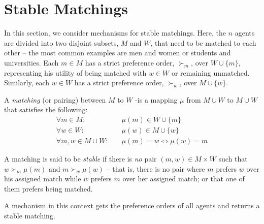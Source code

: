 \newpage

\newcommand{\men}{M}
\newcommand{\women}{W}
\newcommand{\man}{m}
\newcommand{\woman}{w}

\section{Stable Matchings}
In this section, we consider mechanisms for stable matchings. 
Here, the $n$ agents are divided into two disjoint subsets, $\men$ and $\women$, that need to be matched to each other -- the most common examples are men and women or students and universities. 
Each $\man \in \men$ has a strict preference order, $\succ_{\man}$, over $\women \cup \{\man\}$, representing his utility of being matched with $\woman \in \women$ or remaining unmatched.
Similarly, each $\woman \in \women$ has a strict preference order, $\succ_{\woman}$, over $\men \cup \{\woman\}$.  

A \emph{matching} (or pairing) between $\men$ to $\women$ -is a mapping $\mu$ from $\men \cup \women$ to $\men \cup \women$ that satisfies the following:
\begin{align*}
    \forall \man \in \men \colon &\quad \mu(\man) \in \women \cup \{\man\}\\
    \forall \woman \in \women \colon &\quad \mu(\woman) \in \men \cup \{\woman\}\\
    \forall \man, \woman \in \men \cup \women \colon &\quad  \mu(\man) = \woman  \iff \mu(\woman) = \man
\end{align*}


A matching is said to be \emph{stable} if there is \emph{no} pair $(\man, \woman) \in \men \times \women$ such that $\woman \succ_{\man} \mu(\man)$ and $\man \succ_{\woman} \mu(\woman)$ -- that is, there is no pair where $\man$ prefers $\woman$ over his assigned match while $\woman$ prefers $\man$ over her assigned match;  or that one of them prefers being matched.  


A mechanism in this context gets the preference orders of all agents and returns a stable matching.

